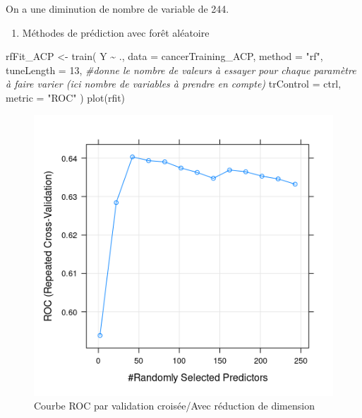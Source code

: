 \documentclass[
  12pt,
]{article}
\newenvironment{Shaded}{\begin{snugshade}}{\end{snugshade}}
\newcommand{\AttributeTok}[1]{\textcolor[rgb]{0.77,0.63,0.00}{#1}}
\newcommand{\CommentTok}[1]{\textcolor[rgb]{0.56,0.35,0.01}{\textit{#1}}}
\newcommand{\DecValTok}[1]{\textcolor[rgb]{0.00,0.00,0.81}{#1}}
\newcommand{\FunctionTok}[1]{\textcolor[rgb]{0.00,0.00,0.00}{#1}}
\newcommand{\NormalTok}[1]{#1}
\newcommand{\OtherTok}[1]{\textcolor[rgb]{0.56,0.35,0.01}{#1}}
\newcommand{\SpecialCharTok}[1]{\textcolor[rgb]{0.00,0.00,0.00}{#1}}
\newcommand{\StringTok}[1]{\textcolor[rgb]{0.31,0.60,0.02}{#1}}
\providecommand{\tightlist}{%
  \setlength{\itemsep}{0pt}\setlength{\parskip}{0pt}}
\begin{document}
On a une diminution de nombre de variable de 244.

\begin{enumerate}
\def\labelenumi{\arabic{enumi}.}
\tightlist
\item
  Méthodes de prédiction avec forêt aléatoire
\end{enumerate}

\begin{Shaded}
\begin{Highlighting}[]
\NormalTok{rfFit\_ACP }\OtherTok{\textless{}{-}} \FunctionTok{train}\NormalTok{(}
\NormalTok{  Y }\SpecialCharTok{\textasciitilde{}}\NormalTok{ .,}
  \AttributeTok{data =}\NormalTok{ cancerTraining\_ACP,}
  \AttributeTok{method =} \StringTok{"rf"}\NormalTok{,}
  \AttributeTok{tuneLength =} \DecValTok{13}\NormalTok{, }\CommentTok{\#donne le nombre de valeurs à essayer pour chaque paramètre à faire varier (ici nombre de variables à prendre en compte)}
  \AttributeTok{trControl =}\NormalTok{ ctrl,}
  \AttributeTok{metric =} \StringTok{"ROC"}
\NormalTok{)}
\FunctionTok{plot}\NormalTok{(rfit)}
\end{Highlighting}
\end{Shaded}

\begin{figure}

{\centering \includegraphics[width=0.5\linewidth]{pictures/ROC_cross_validation_acp} 

}

\caption{Courbe ROC par validation croisée/Avec réduction de dimension}\label{fig:roc_acp}
\end{figure}
\end{document}

